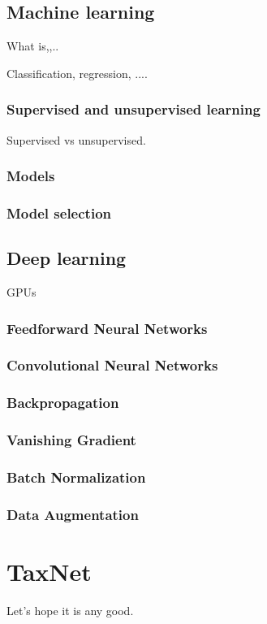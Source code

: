 \documentclass[times, utf8, diplomski]{fer}
\begin{document}
\section{Machine learning}
What is,,..

Classification, regression, ....
\subsection{Supervised and unsupervised learning}
Supervised vs unsupervised.

\subsection{Models}
\subsection{Model selection}

\section{Deep learning}
GPUs

\subsection{Feedforward Neural Networks}
\subsection{Convolutional Neural Networks}
\subsection{Backpropagation}
\subsection{Vanishing Gradient}
\subsection{Batch Normalization}
\subsection{Data Augmentation}


\chapter{TaxNet}
Let's hope it is any good.
\end{document}
